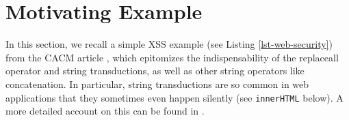 \section{Motivating Example}
\label{sec:motivation}

In this section, we recall a simple XSS example (see Listing
\ref{lst-web-security}) from the CACM article 
\cite{Kern}, which epitomizes the indispensability of the replaceall operator 
and string transductions, as well as other string operators like concatenation.
In particular, string transductions are so common in web applications that they
sometimes even happen silently (see \texttt{innerHTML} below). A more detailed
account on this can be found in \cite{systematic-transduction}.














